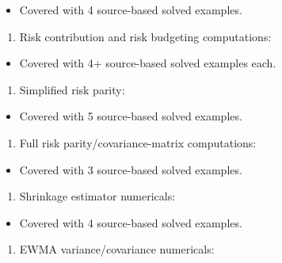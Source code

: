 \documentclass[
]{article}
\providecommand{\tightlist}{%
  \setlength{\itemsep}{0pt}\setlength{\parskip}{0pt}}
\begin{document}
\begin{itemize}
\tightlist
\item
  Covered with 4 source-based solved examples.
\end{itemize}

\begin{enumerate}
\def\labelenumi{\arabic{enumi}.}
\setcounter{enumi}{1}
\tightlist
\item
  Risk contribution and risk budgeting computations:
\end{enumerate}

\begin{itemize}
\tightlist
\item
  Covered with 4+ source-based solved examples each.
\end{itemize}

\begin{enumerate}
\def\labelenumi{\arabic{enumi}.}
\setcounter{enumi}{2}
\tightlist
\item
  Simplified risk parity:
\end{enumerate}

\begin{itemize}
\tightlist
\item
  Covered with 5 source-based solved examples.
\end{itemize}

\begin{enumerate}
\def\labelenumi{\arabic{enumi}.}
\setcounter{enumi}{3}
\tightlist
\item
  Full risk parity/covariance-matrix computations:
\end{enumerate}

\begin{itemize}
\tightlist
\item
  Covered with 3 source-based solved examples.
\end{itemize}

\begin{enumerate}
\def\labelenumi{\arabic{enumi}.}
\setcounter{enumi}{4}
\tightlist
\item
  Shrinkage estimator numericals:
\end{enumerate}

\begin{itemize}
\tightlist
\item
  Covered with 4 source-based solved examples.
\end{itemize}

\begin{enumerate}
\def\labelenumi{\arabic{enumi}.}
\setcounter{enumi}{5}
\tightlist
\item
  EWMA variance/covariance numericals:
\end{enumerate}
\end{document}
